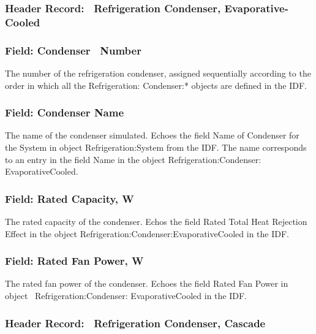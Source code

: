 \subsubsection{Header Record:~ Refrigeration Condenser, Evaporative-Cooled}\label{header-record-refrigeration-condenser-evaporative-cooled}

\subsubsection{Field: Condenser~ Number}\label{field-condenser-number-3}

The number of the refrigeration condenser, assigned sequentially according to the order in which all the Refrigeration: Condenser:* objects are defined in the IDF.

\subsubsection{Field: Condenser Name}\label{field-condenser-name-3}

The name of the condenser simulated. Echoes the field Name of Condenser for the System in object Refrigeration:System from the IDF. The name corresponds to an entry in the field Name in the object Refrigeration:Condenser: EvaporativeCooled.

\subsubsection{Field: Rated Capacity, W}\label{field-rated-capacity-w-2}

The rated capacity of the condenser. Echos the field Rated Total Heat Rejection Effect in the object Refrigeration:Condenser:EvaporativeCooled in the IDF.

\subsubsection{Field: Rated Fan Power, W}\label{field-rated-fan-power-w-1}

The rated fan power of the condenser. Echoes the field Rated Fan Power in object~ Refrigeration:Condenser: EvaporativeCooled in the IDF.

\subsubsection{Header Record:~ Refrigeration Condenser, Cascade}\label{header-record-refrigeration-condenser-cascade}

